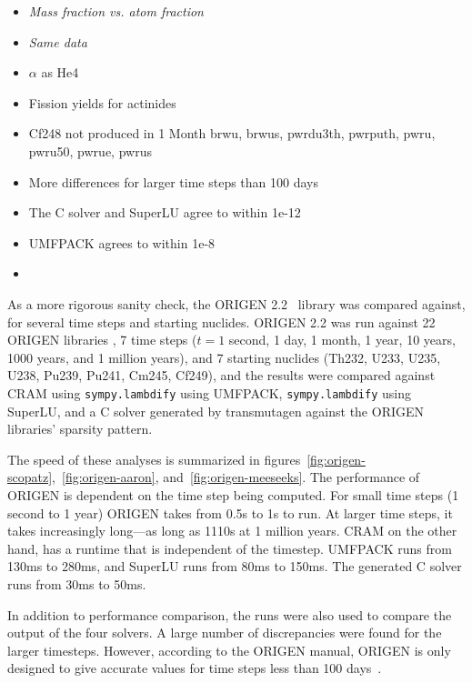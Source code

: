 \begin{itemize}
\item \it{Mass fraction vs. atom fraction}
\item {\it Same data}
\item $\alpha$ as He4
\item Fission yields for actinides
\item Cf248 not produced in 1 Month brwu, brwus, pwrdu3th, pwrputh, pwru,
  pwru50, pwrue, pwrus
\item More differences for larger time steps than 100 days
\item The C solver and SuperLU agree to within 1e-12
\item UMFPACK agrees to within 1e-8
\item {}
\end{itemize}

As a more rigorous sanity check, the ORIGEN 2.2~\cite{ationneeded} library was
compared against, for several time steps and starting nuclides. ORIGEN 2.2 was
run against 22 ORIGEN libraries , 7 time steps
($t= 1$ second, 1 day, 1 month, 1 year, 10 years, 1000 years, and 1 million
years), and 7 starting nuclides (Th232, U233, U235, U238, Pu239, Pu241, Cm245,
Cf249), and the results were compared against CRAM using
\texttt{sympy.\allowbreak{}lambdify} using UMFPACK,
\texttt{sympy.\allowbreak{}lambdify} using SuperLU, and a C solver generated
by transmutagen against the ORIGEN libraries' sparsity pattern.

 The speed of these analyses is summarized in
figures~\ref{fig:origen-scopatz},~\ref{fig:origen-aaron},
and~\ref{fig:origen-meeseeks}. The performance of ORIGEN is dependent on the
time step being computed. For small time steps (1 second to 1 year) ORIGEN
takes from 0.5\;s to 1\;s to run. At larger time steps, it takes increasingly
long---as long as 1110\;s at 1 million years. CRAM on the other hand, has a
runtime that is independent of the timestep. UMFPACK runs from 130\;ms to
280\;ms, and SuperLU runs from 80\;ms to 150\;ms. The generated C solver runs
from 30\;ms to 50\;ms. 

In addition to performance comparison, the runs were also used to compare the
output of the four solvers. A large number of discrepancies were found for the
larger timesteps. However, according to the ORIGEN manual, ORIGEN is only
designed to give accurate values for time steps less than 100
days~\cite{ationneeded}.


